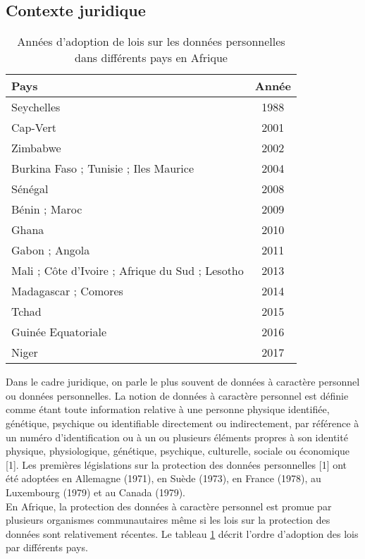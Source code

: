 \subsection{Contexte juridique}
\begin{table}[hbt!]
	\centering
	\begin{tabular}{| l | c |} 
		\hline
		Pays & Année \\ [0.5ex] 
		\hline
		Seychelles & 1988 \\ 
		\hline
		Cap-Vert & 2001 \\
		\hline
		Zimbabwe & 2002 \\
		\hline
		Burkina Faso ; Tunisie ; Iles Maurice & 2004 \\
		\hline
		Sénégal & 2008 \\
		\hline
		Bénin ; Maroc & 2009 \\
		\hline
		Ghana & 2010 \\
		\hline
		Gabon ; Angola & 2011 \\
		\hline
		Mali ; Côte d’Ivoire ; Afrique du Sud ; Lesotho & 2013 \\
		\hline
		Madagascar ; Comores & 2014 \\
		\hline
		Tchad & 2015 \\
		\hline
		Guinée Equatoriale & 2016 \\
		\hline
		Niger & 2017 \\ [1ex] 
		\hline
	\end{tabular}
	\caption{Années d'adoption de lois sur les données personnelles dans différents pays en Afrique}
	\label{table:5.1}
\end{table}
Dans le cadre juridique, on parle le plus souvent de données à caractère personnel ou données personnelles. La notion de données à caractère personnel est définie comme étant toute information relative à une personne physique identifiée, génétique, psychique ou identifiable directement ou indirectement, par référence à un numéro d’identification ou à un ou plusieurs éléments propres à son identité physique, physiologique, génétique, psychique, culturelle, sociale ou économique [1].
Les premières législations sur la protection des données personnelles [1] ont été adoptées en Allemagne (1971), en Suède (1973), en France (1978), au Luxembourg (1979) et au Canada (1979).\\
En Afrique, la protection des données à caractère personnel est promue par plusieurs organismes communautaires même si les lois sur la protection des données sont relativement récentes. Le tableau \ref{table:5.1} décrit l’ordre d’adoption des lois par différents pays.\\
